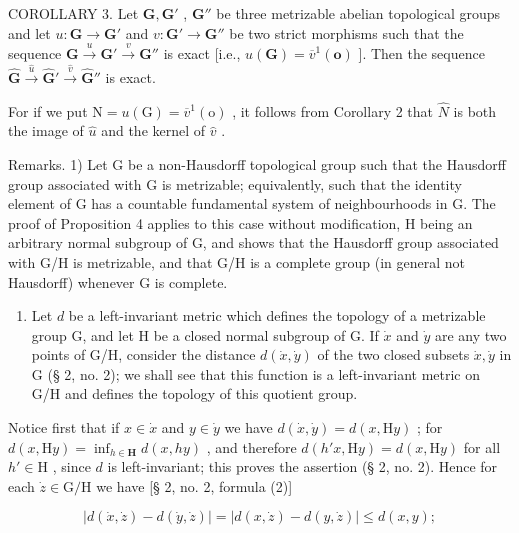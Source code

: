 COROLLARY 3. Let \(\mathbf{G}, \mathbf{G}'\) , \(\mathbf{G}''\) be three metrizable abelian topological groups and let \(u: \mathbf{G} \to \mathbf{G}'\) and \(v: \mathbf{G}' \to \mathbf{G}''\) be two strict morphisms such that the sequence \(\mathbf{G} \xrightarrow{u} \mathbf{G}' \xrightarrow{v} \mathbf{G}''\) is exact {[}i.e., \(u(\mathbf{G}) = \overline{v}^{1}(\mathbf{o})\) {]}. Then the sequence \(\hat{\mathbf{G}} \xrightarrow{\hat{u}} \hat{\mathbf{G}}' \xrightarrow{\hat{v}} \hat{\mathbf{G}}''\) is exact.

For if we put \(\mathrm{N} = u(\mathrm{G}) = \overline{v}^{1}(\mathrm{o})\) , it follows from Corollary 2 that \(\hat{N}\) is both the image of \(\hat{u}\) and the kernel of \(\hat{v}\) .

Remarks. 1) Let G be a non-Hausdorff topological group such that the Hausdorff group associated with G is metrizable; equivalently, such that the identity element of G has a countable fundamental system of neighbourhoods in G. The proof of Proposition 4 applies to this case without modification, H being an arbitrary normal subgroup of G, and shows that the Hausdorff group associated with G/H is metrizable, and that G/H is a complete group (in general not Hausdorff) whenever G is complete.

\begin{enumerate}
\def\labelenumi{\arabic{enumi})}
\setcounter{enumi}{1}
\tightlist
\item
  Let \(d\) be a left-invariant metric which defines the topology of a metrizable group G, and let H be a closed normal subgroup of G. If \(\dot{x}\) and \(\dot{y}\) are any two points of G/H, consider the distance \(d(\dot{x},\dot{y})\) of the two closed subsets \(\dot{x},\dot{y}\) in G (§ 2, no. 2); we shall see that this function is a left-invariant metric on G/H and defines the topology of this quotient group.
\end{enumerate}

Notice first that if \(x \in \dot{x}\) and \(y \in \dot{y}\) we have \(d(\dot{x}, \dot{y}) = d(x, \mathrm{H}y)\) ; for \(d(x, \mathrm{H}y) = \inf_{h \in \mathbf{H}} d(x, h y)\) , and therefore \(d(h' x, \mathrm{H} y) = d(x, \mathrm{H} y)\) for all \(h' \in \mathrm{H}\) , since \(d\) is left-invariant; this proves the assertion (§ 2, no. 2). Hence for each \(\dot{z} \in \mathrm{G} / \mathrm{H}\) we have {[}§ 2, no. 2, formula (2){]}

\[
\left| d (\dot {x}, \dot {z}) - d (\dot {y}, \dot {z}) \right| = \left| d (x, \dot {z}) - d (y, \dot {z}) \right| \leqslant d (x, y);
\]

